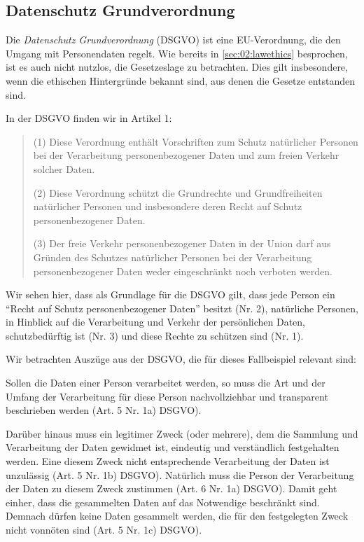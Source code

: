 
\subsection{Datenschutz Grundverordnung}

Die \emph{Datenschutz Grundverordnung} (DSGVO) ist eine EU-Verordnung, die den Umgang mit Personendaten regelt.
Wie bereits in \cref{sec:02:lawethics} besprochen, ist es auch nicht nutzlos, die Gesetzeslage zu betrachten.
Dies gilt insbesondere, wenn die ethischen Hintergründe bekannt sind, aus denen die Gesetze entstanden sind.

In der DSGVO finden wir in Artikel 1:
\blockquote{
    (1) Diese Verordnung enthält Vorschriften zum Schutz natürlicher Personen bei der Verarbeitung personenbezogener Daten und zum freien Verkehr solcher Daten.

    (2) Diese Verordnung schützt die Grundrechte und Grundfreiheiten natürlicher Personen und insbesondere deren Recht auf Schutz personenbezogener Daten.

    (3) Der freie Verkehr personenbezogener Daten in der Union darf aus Gründen des Schutzes natürlicher Personen bei der Verarbeitung personenbezogener Daten weder eingeschränkt noch verboten werden.
}

Wir sehen hier, dass als Grundlage für die DSGVO gilt, dass jede Person ein \enquote{Recht auf Schutz personenbezogener Daten} besitzt (Nr. 2), 
natürliche Personen, in Hinblick auf die Verarbeitung und Verkehr der persönlichen Daten, schutzbedürftig ist (Nr. 3) und diese Rechte zu schützen sind (Nr. 1).

Wir betrachten Auszüge aus der DSGVO, die für dieses Fallbeispiel relevant sind:

Sollen die Daten einer Person verarbeitet werden, so muss die Art und der Umfang der Verarbeitung für diese Person nachvollziehbar und transparent beschrieben werden (Art. 5 Nr. 1a) DSGVO).

Darüber hinaus muss ein legitimer Zweck (oder mehrere), dem die Sammlung und Verarbeitung der Daten gewidmet ist, eindeutig und verständlich festgehalten werden. Eine diesem Zweck nicht entsprechende Verarbeitung der Daten ist unzulässig (Art. 5 Nr. 1b) DSGVO). Natürlich muss die Person der Verarbeitung der Daten zu diesem Zweck zustimmen (Art. 6 Nr. 1a) DSGVO).
Damit geht einher, dass die gesammelten Daten auf das Notwendige beschränkt sind.
Demnach dürfen keine Daten gesammelt werden, die für den festgelegten Zweck nicht vonnöten sind (Art. 5 Nr. 1c) DSGVO).

